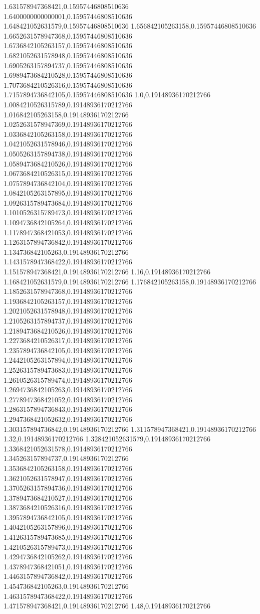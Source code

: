 1.631578947368421,0.15957446808510636
1.6400000000000001,0.15957446808510636
1.648421052631579,0.15957446808510636
1.656842105263158,0.15957446808510636
1.6652631578947368,0.15957446808510636
1.6736842105263157,0.15957446808510636
1.6821052631578948,0.15957446808510636
1.6905263157894737,0.15957446808510636
1.6989473684210528,0.15957446808510636
1.7073684210526316,0.15957446808510636
1.7157894736842105,0.15957446808510636
1.0,0.19148936170212766
1.0084210526315789,0.19148936170212766
1.016842105263158,0.19148936170212766
1.0252631578947369,0.19148936170212766
1.0336842105263158,0.19148936170212766
1.0421052631578946,0.19148936170212766
1.0505263157894738,0.19148936170212766
1.0589473684210526,0.19148936170212766
1.0673684210526315,0.19148936170212766
1.0757894736842104,0.19148936170212766
1.0842105263157895,0.19148936170212766
1.0926315789473684,0.19148936170212766
1.1010526315789473,0.19148936170212766
1.1094736842105264,0.19148936170212766
1.1178947368421053,0.19148936170212766
1.1263157894736842,0.19148936170212766
1.134736842105263,0.19148936170212766
1.1431578947368422,0.19148936170212766
1.151578947368421,0.19148936170212766
1.16,0.19148936170212766
1.168421052631579,0.19148936170212766
1.176842105263158,0.19148936170212766
1.1852631578947368,0.19148936170212766
1.1936842105263157,0.19148936170212766
1.2021052631578948,0.19148936170212766
1.2105263157894737,0.19148936170212766
1.2189473684210526,0.19148936170212766
1.2273684210526317,0.19148936170212766
1.2357894736842105,0.19148936170212766
1.2442105263157894,0.19148936170212766
1.2526315789473683,0.19148936170212766
1.2610526315789474,0.19148936170212766
1.2694736842105263,0.19148936170212766
1.2778947368421052,0.19148936170212766
1.2863157894736843,0.19148936170212766
1.2947368421052632,0.19148936170212766
1.303157894736842,0.19148936170212766
1.311578947368421,0.19148936170212766
1.32,0.19148936170212766
1.328421052631579,0.19148936170212766
1.3368421052631578,0.19148936170212766
1.345263157894737,0.19148936170212766
1.3536842105263158,0.19148936170212766
1.3621052631578947,0.19148936170212766
1.3705263157894736,0.19148936170212766
1.3789473684210527,0.19148936170212766
1.3873684210526316,0.19148936170212766
1.3957894736842105,0.19148936170212766
1.4042105263157896,0.19148936170212766
1.4126315789473685,0.19148936170212766
1.4210526315789473,0.19148936170212766
1.4294736842105262,0.19148936170212766
1.4378947368421051,0.19148936170212766
1.4463157894736842,0.19148936170212766
1.454736842105263,0.19148936170212766
1.4631578947368422,0.19148936170212766
1.471578947368421,0.19148936170212766
1.48,0.19148936170212766
